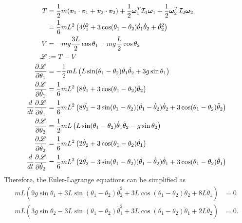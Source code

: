 \documentclass[11pt]{article}
\begin{document}
\begin{align*}
	T &= \frac{1}{2} m ({\bm{ v}}_1 \cdot {\bm{ v}}_1+ {\bm{ v}}_2 \cdot {\bm{ v}}_2) + \frac{1}{2} {\bm{ \omega}}_1 ^{T} \mathcal{ I}_1 {\bm{ \omega}}_1 + \frac{1}{2} {\bm{ \omega}}_2^{T} \mathcal{ I}_2 {\bm{ \omega}}_2  \\
	&= \frac{1}{6} mL^2 \left( 4 \dot{\theta}_1^2 + 3 \cos ( \theta_1 - \theta_2) \dot{\theta}_1 \dot{\theta}_2 + \dot{\theta}_2^2 \right)  \\
	V &= -mg \frac{3L}{2}\cos \theta_1 -mg \frac{L}{2} \cos \theta_2 \\
	\mathscr{L} &:= T-V\\
	\frac{\partial \mathscr{L}}{\partial \theta_1} &= -\frac{1}{2} mL \left( L \sin(\theta_1 - \theta_2) \dot{\theta}_1 \dot{\theta}_2 + 3g \sin \theta_1  \right) \\
	\frac{\partial \mathscr{L}}{\partial \dot{\theta}_1} &= \frac{1}{6} mL^2 \left( 8 \dot{\theta}_1 + 3 \cos (\theta_1 - \theta_2) \dot{\theta}_2 \right)  \\
	\frac{d}{dt} \frac{\partial \mathscr{L}}{\partial \dot{\theta}_1} &= \frac{1}{6} mL^2 \left( 8 \ddot{\theta_1} -3 \sin(\theta_1 - \theta_2) (\dot{\theta}_1 -\dot{\theta}_2) \dot{\theta}_2 + 3 \cos(\theta_1 - \theta_2) \ddot{\theta}_2 \right)  \\
	\frac{\partial \mathscr{L}}{\partial \theta_2} &= \frac{1}{2} mL \left( L \sin(\theta_1 - \theta_2) \dot{\theta}_1 \dot{\theta}_2 - g \sin \theta_2  \right) \\
	\frac{\partial \mathscr{L}}{\partial \dot{\theta}_2} &= \frac{1}{6} mL^2 \left( 2 \dot{\theta}_2 + 3 \cos (\theta_1 - \theta_2) \dot{\theta}_1 \right)  \\
	\frac{d}{dt} \frac{\partial \mathscr{L}}{\partial \dot{\theta}_2} &= \frac{1}{6} mL^2 \left( 2 \ddot{\theta_2} -3 \sin(\theta_1 - \theta_2) (\dot{\theta}_1 -\dot{\theta}_2) \dot{\theta}_1 + 3 \cos(\theta_1 - \theta_2) \ddot{\theta}_1 \right)  
\end{align*}
Therefore, the Euler-Lagrange equations can be simplified as
\begin{align}
	mL \left( 9g \sin \theta_1 + 3L \sin (\theta_1 - \theta_2) \dot{\theta}_2^2 + 3L\cos (\theta_1 - \theta_2) \ddot{\theta}_2 + 8L \ddot{\theta}_1 \right) &= 0 \\
	mL \left( 3g \sin \theta_2 - 3L \sin (\theta_1 - \theta_2) \dot{\theta}_1^2 + 3L \cos (\theta_1 - \theta_2) \ddot{\theta}_1 + 2L \ddot{\theta}_2 \right) &= 0 .
\end{align}
\end{document}
